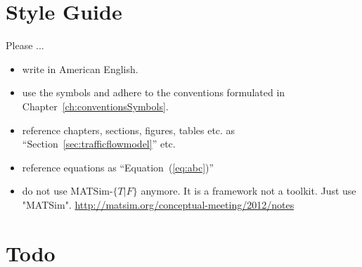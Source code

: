 



\section*{Style Guide}
\label{sec:styleguide}

Please ...

\begin{itemize}

\item write in American English.

\item use the symbols and adhere to the conventions formulated in Chapter~\ref{ch:conventionsSymbols}.

\item reference chapters, sections, figures, tables etc. as ``Section~\ref{sec:trafficflowmodel}'' etc.

\item reference equations as ``Equation~(\ref{eq:abc})''

\item do not use MATSim-$\{T\lvert F\}$ anymore. It is a framework not a toolkit. Just use "MATSim". \url{http://matsim.org/conceptual-meeting/2012/notes}

\end{itemize}

\vfill\eject

\section*{Todo}

